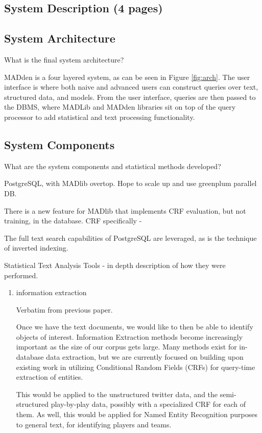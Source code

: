 \documentclass{article}
\newcommand{\system}{MADden\xspace}
\begin{document}
\begin{enumerate}
  \section{System Description (4 pages)}
  \subsection{System Architecture}
  What is the final system architecture?

  {\system} is a four layered system, as can be seen in Figure \ref{fig:arch}.
  The user interface is where both naive and advanced users can construct queries over text, structured data, and models.
  From the user interface,
  queries are then passed to the DBMS,
  where MADLib and {\system} libraries sit on top of the query processor to add statistical and text processing functionality.


  \subsection{System Components}
  What are the system components and statistical methods developed?

  PostgreSQL, with MADlib overtop.
  Hope to scale up and use greenplum parallel DB.

  There is a new feature for MADlib that implements CRF evaluation, but not training, in the database.
  CRF specifically -

  The full text search capabilities of PostgreSQL are leveraged,
  as is the technique of inverted indexing.


  Statistical Text Analysis Tools - in depth description of how they were performed.
  \begin{enumerate}
  \item information extraction

    Verbatim from previous paper.

    Once we have the text documents, we would like to then be able to identify
    objects of interest. Information Extraction methods become increasingly
    important as the size of our corpus gets large. Many methods exist for in-database data
    extraction, but we are currently focused on building upon existing work in
    utilizing Conditional Random Fields (CRFs) for query-time extraction of
    entities.

    This would be applied to the unstructured twitter data,
    and the semi-structured play-by-play data,
    possibly with a specialized CRF for each of them.
    As well, this would be applied for Named Entity Recognition purposes to general text, for identifying players and teams.


\end{enumerate}
\end{enumerate}
\end{document}
